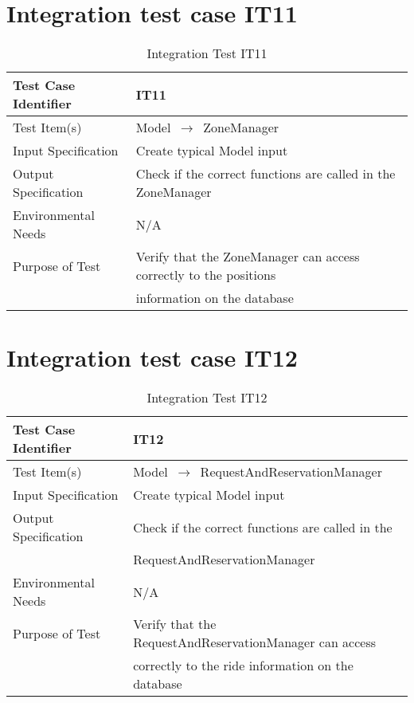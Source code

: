 \documentclass[../../testPlan.tex]{subfiles}
\begin{document}
		
	\section{Integration test case IT11}
		\begin{table}[H]
			\centering
			\label{IT11}
			\begin{tabular}{ll}
				\hline
				Test Case Identifier & IT11 \\ \hline
				Test Item(s)         & Model $\,\to\,$ ZoneManager\\ \hline
				Input Specification  & Create typical Model input  \\ \hline
				Output Specification & Check if the correct functions are called in the ZoneManager\\ \hline
				Environmental Needs  &  N/A \\ \hline
				Purpose of Test      &  Verify that the ZoneManager can access correctly to the positions \\ & information on the database \\ \hline
			\end{tabular}
			\caption{Integration Test IT11}
		\end{table}
		
		
	\section{Integration test case IT12}
		\begin{table}[H]
			\centering
			\label{IT12}
			\begin{tabular}{ll}
				\hline
				Test Case Identifier & IT12 \\ \hline
				Test Item(s)         & Model $\,\to\,$ RequestAndReservationManager\\ \hline
				Input Specification  & Create typical Model input  \\ \hline
				Output Specification & Check if the correct functions are called in the \\ & RequestAndReservationManager\\ \hline
				Environmental Needs  &  N/A \\ \hline
				Purpose of Test      &  Verify that the RequestAndReservationManager can access \\ & correctly to the ride information on the database \\ \hline
			\end{tabular}
			\caption{Integration Test IT12}
		\end{table}
		
\end{document}
